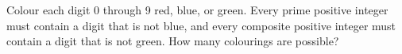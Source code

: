Colour each digit 0 through 9 red, blue, or green. Every prime positive integer must contain a digit that is not blue, and every composite positive integer must contain a digit that is not green. How many colourings are possible?

